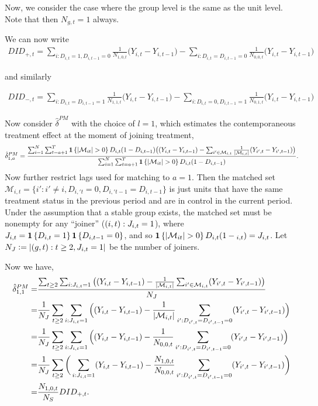 \documentclass[12pt]{article}
\begin{document}
Now, we consider the case where the group level is the same as the unit level. Note that then $N_{g,t}=1$ always. 



We can now write 
\begin{align*}
    DID_{+,t}=\sum_{i:D_{i,t}=1, D_{i, t-1}=0}
        \frac{1}{N_{1,0,t}}
        \big(Y_{i,t} - Y_{i, t-1} \big) 
    - \sum_{i:D_{i,t}=D_{i, t-1}=0}
        \frac{1}{N_{0,0,t}}
        \big(Y_{i,t} - Y_{i, t-1} \big) 
\end{align*}

and similarly 

\begin{align*}
    DID_{-,t}=\sum_{i:D_{i,t}=D_{i, t-1}=1}
        \frac{1}{N_{1,1,t}}
        \big(Y_{i,t} - Y_{i, t-1} \big) 
    - \sum_{i:D_{i,t}=0,D_{i, t-1}=1}
        \frac{1}{N_{0,1,t}}
        \big(Y_{i,t} - Y_{i, t-1} \big) 
\end{align*}


Now consider $\hat\delta^{PM}$ with the choice of $l=1$, which estimates the contemporaneous treatment effect at the moment of joining treatment,
\begin{align*}
    \hat\delta^{PM}_{1,a}=
        \frac{\sum_{i=1}^{N}\sum_{t=a+1}^{T} \indic{|\mc M_{it}|>0} \Dit (1-D_{i,t-1})
        \big( (Y_{i, t} - Y_{i, t-1}) 
        - \sum_{i' \in \mathcal{M}_{i,t}} \frac{1}{|\mc{M}_{i,t}|} (Y_{i', t}-Y_{i',t-1} ) \big) }
        {\sum_{i=1}^{N}\sum_{t=a+1}^{T} \indic{|\mc M_{it}|>0} \Dit (1-D_{i,t-1})}.
\end{align*}
Now further restrict lags used for matching to $a=1$. Then the matched set $\mathcal{M}_{i,t} = \big\{ i' : i'\neq i, D_{i,'t}=0, D_{i,'t-1}=D_{i,t-1}\big\}$ is just units that have the same treatment status in the previous period and are in control in the current period. Under the assumption that a stable group exists, the matched set must be nonempty for any ``joiner'' ($(i,t) : J_{i,t}=1$), where $J_{i,t}=\mathbf{1}\left\{D_{i,t}=1\right\} \mathbf{1}\left\{D_{i,t-1}=0\right\}$, and so $\indic{|\mc M_{it}|>0} \Dit(1-\D_{i,t})=\Jit$. Let $N_J\vcentcolon= |(g,t):t\geq2, J_{i,t}=1|$ be the number of joiners.

Now we have,
\begin{align*}\small
    \hat\delta^{PM}_{1,1}
    =& \frac{\sum_{t\geq2} \sum_{i:J_{i,t}=1}
            \big( (Y_{i, t} - Y_{i, t-1}) - \frac{1}{|\mathcal{M}_{i,t}|}\sum_{i' \in \mathcal{M}_{i,t}} (Y_{i', t}-Y_{i',t-1} ) \big) }
        {N_J} \\
    =& \frac{1}{N_J}\sum_{t\geq2}
        \sum_{i:J_{i,t}=1}
            \Big( (Y_{i, t} - Y_{i, t-1}) - \frac{1}{|\mathcal{M}_{i,t}|}\sum_{i' : D_{i',t}=D_{i',t-1}=0} (Y_{i', t}-Y_{i',t-1} ) \Big) \\
    =& \frac{1}{N_J}\sum_{t\geq2}
        \sum_{i:J_{i,t}=1}
            \Big( (Y_{i, t} - Y_{i, t-1}) - \frac{1}{N_{0,0,t}}\sum_{i' : D_{i',t}=D_{i',t-1}=0} (Y_{i', t}-Y_{i',t-1} ) \Big) \\
    =& \frac{1}{N_J}\sum_{t\geq2}\bigg(
        \sum_{i:J_{i,t}=1}
            (Y_{i, t} - Y_{i, t-1}) - \frac{N_{1,0,t}}{N_{0,0,t}}\sum_{i' : D_{i',t}=D_{i',t-1}=0} (Y_{i', t}-Y_{i',t-1} )\bigg)\\
    =&\frac{N_{1,0,t}}{N_S}DID_{+,t}.
\end{align*}
\end{document}
